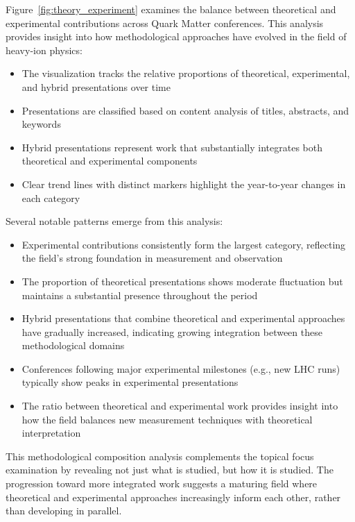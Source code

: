 \documentclass[a4paper,11pt]{article}
\begin{document}
Figure~\ref{fig:theory_experiment} examines the balance between theoretical and experimental contributions across Quark Matter conferences. This analysis provides insight into how methodological approaches have evolved in the field of heavy-ion physics:

\begin{itemize}
    \item The visualization tracks the relative proportions of theoretical, experimental, and hybrid presentations over time
    \item Presentations are classified based on content analysis of titles, abstracts, and keywords
    \item Hybrid presentations represent work that substantially integrates both theoretical and experimental components
    \item Clear trend lines with distinct markers highlight the year-to-year changes in each category
\end{itemize}

Several notable patterns emerge from this analysis:

\begin{itemize}
    \item Experimental contributions consistently form the largest category, reflecting the field's strong foundation in measurement and observation
    \item The proportion of theoretical presentations shows moderate fluctuation but maintains a substantial presence throughout the period
    \item Hybrid presentations that combine theoretical and experimental approaches have gradually increased, indicating growing integration between these methodological domains
    \item Conferences following major experimental milestones (e.g., new LHC runs) typically show peaks in experimental presentations
    \item The ratio between theoretical and experimental work provides insight into how the field balances new measurement techniques with theoretical interpretation
\end{itemize}

This methodological composition analysis complements the topical focus examination by revealing not just what is studied, but how it is studied. The progression toward more integrated work suggests a maturing field where theoretical and experimental approaches increasingly inform each other, rather than developing in parallel.
\end{document}
